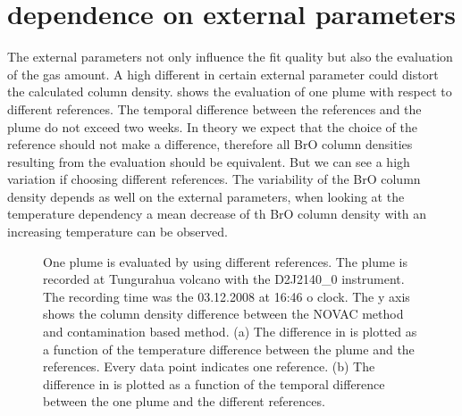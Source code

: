 \documentclass  [
  paper    = a4,
  BCOR     = 10mm,
  twoside,
  fontsize = 12pt,
  fleqn,
  toc      = bibnumbered,
  toc      = listofnumbered,
  numbers  = noendperiod,
  headings = normal,
  listof   = leveldown,
  version  = 3.03
]                                       {scrreprt}
\begin{document}
	\section{  dependence on external parameters\label{Chap:BrOdep}}
	The external parameters not only influence the fit quality but also the evaluation of the gas amount. A high different in certain external parameter could distort the calculated   column density.  shows the evaluation of one plume with respect to different references. The temporal difference between the references and the plume do not exceed two weeks. In theory we expect that the choice of  the reference should not make a difference, therefore all BrO column densities resulting from the evaluation should be equivalent. But we can see a high variation if choosing different references. The variability of the BrO column density depends as well on the external parameters, when looking at the temperature dependency a mean decrease of th BrO column density with an increasing temperature can be observed.
		\begin{figure}
		\caption{One plume is evaluated by using different references. The plume is recorded at Tungurahua volcano with the D2J2140\_0 instrument. The recording time was the  03.12.2008  at 16:46 o clock. The y axis shows the   column density difference between the NOVAC method and contamination based method. (a) The difference in   is plotted as a function of the temperature difference between the plume and the references. Every data point indicates one reference. (b) The difference in   is plotted as a function of the temporal difference between the one plume and the different references.}
		\label{fig:d2j2140060218difftemperature-cbro}		
	\end{figure}
\end{document}
